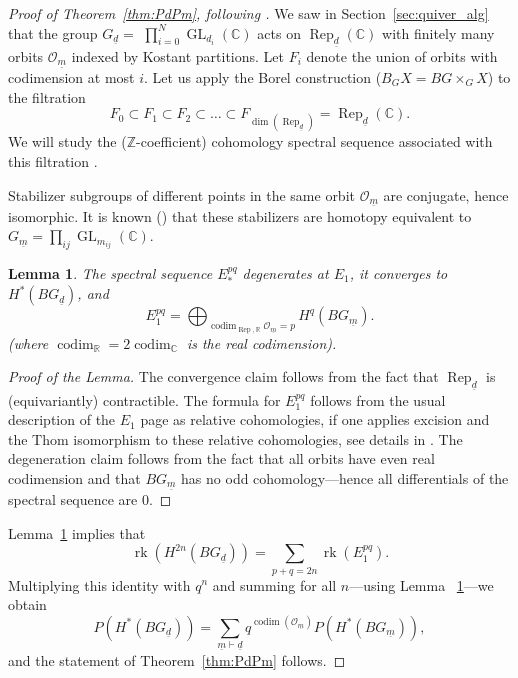 \documentclass[a4paper]{amsart}
\DeclareMathOperator{\rk}{rk}
\DeclareMathOperator{\Rep}{\mathrm{Rep}}
\DeclareMathOperator{\codim}{\mathrm{codim}}
\DeclareMathOperator{\GL}{\mathrm{GL}}
\newcommand{\R}{\mathbb{R}}
\newcommand{\C}{\mathbb{C}}
\newcommand{\Z}{\mathbb{Z}}
\newcommand{\CO}{\mathcal{O}}
\newcommand{\um}{\underline{m}}
\newcommand{\ud}{\underline{d}}
\newtheorem{lemma}[thm]{Lemma}
\theoremstyle{plain}
\begin{document}
\begin{proof}[Proof of Theorem~\ref{thm:PdPm}, following  \cite{RRcoha}] We saw in Section~\ref{sec:quiver_alg} that the group $G_{\ud}=$ $\prod_{i=0}^N\GL_{d_i}(\C)$ acts on $\Rep_{\ud}(\C)$ with finitely many orbits $\CO_{\um}$ indexed by Kostant partitions. Let $F_i$ denote the union of orbits with codimension at most $i$. Let us apply the Borel construction ($B_G X=BG \times_G X$) to the filtration
\[
F_0 \subset F_1 \subset F_2 \subset \ldots \subset  F_{\dim(\Rep_{\ud})} =\Rep_{\ud}(\C).
\]
We will study the ($\Z$-coefficient) cohomology spectral sequence associated with this filtration \cite{AB83, Kaz97, RRcoha}.

Stabilizer subgroups of different points in the same orbit $\CO_{\um}$ are conjugate, hence isomorphic. It is known (\cite[Prop~3.6]{FRduke}) that these stabilizers are homotopy equivalent to $G_{\um}=\prod_{ij} \GL_{m_{ij}}(\C)$.

\begin{lemma}\cite{Kaz97, RRcoha}
\label{lemma:SS}
    The spectral sequence $E_*^{pq}$ degenerates at $E_1$, it converges to $H^*(BG_{\ud})$, and 
\[
E_1^{pq}= \bigoplus_{\codim_{\Rep,\R} \CO_{\um}=p}
H^q(B G_{\um} ). 
\]
(where $\codim_{\R}=2\codim_{\C}$ is the real codimension).
\end{lemma}
\begin{proof}[Proof of the Lemma]
  The convergence claim follows from the fact that $\Rep_{\ud}$ is (equivariantly) contractible. The formula for $E_1^{pq}$ follows from the usual description of the $E_1$ page as relative cohomologies, if one applies excision and the Thom isomorphism to these relative cohomologies, see details in \cite{Kaz97, RRcoha}. The degeneration claim follows from the fact that all orbits have even real codimension and that $B G_{\um}$ %
has no odd cohomology---hence all differentials of the spectral sequence are 0.  
\end{proof}


Lemma~\ref{lemma:SS} implies that  
\[
\rk \left( H^{2n}(B G_{\ud}) \right) = \sum_{p+q=2n} \rk(E_1^{pq}). 
\]
Multiplying this identity with $q^n$ and summing for all $n$---using Lemma~ \ref{lemma:SS}---we obtain 
\begin{equation} \label{eq:gyor}
    P(H^*(B G_{\ud}))=\sum_{\um \vdash \ud} q^{\codim(\CO_{\um})} P(H^*(B G_{\um})),
\end{equation}
and the statement of Theorem~\ref{thm:PdPm} follows.
\end{proof}
\end{document}
